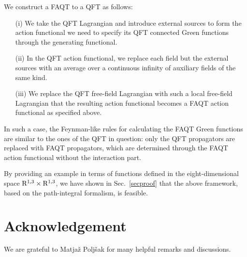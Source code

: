 \documentclass[a4paper,12pt]{article}
\newcommand{\RR}{{\rm R}}
\newcommand{\RRRR}{\RR^{1,3}}
\begin{document}
We construct a FAQT to a QFT as follows:
\begin{itemize}
\item[(i)]We take the QFT Lagrangian and introduce external sources to form the action functional we need to specify its QFT connected Green functions through the generating functional.
\item[(ii)]In the QFT action functional, we replace each field but the external sources with an average over a continuous infinity of auxiliary fields of the same kind.
\item[(iii)]We replace the QFT free-field Lagrangian with such a local free-field Lagrangian that the resulting action functional becomes a FAQT action functional as specified above.
\end{itemize}
In such a case, the Feynman-like rules for calculating the FAQT Green functions are similar to the ones of the QFT in question: only the QFT propagators are replaced with FAQT propagators, which are determined through the FAQT action functional without the interaction part.

By providing an example in terms of functions defined in the eight-dimensional space $\RRRR \times \RRRR$, we have shown in Sec.~\ref{secproof} that the above framework, based on the path-integral formalism, is feasible.

\section*{Acknowledgement}

We are grateful to Matja\v z Polj\v sak for many helpful remarks and discussions.
\end{document}
